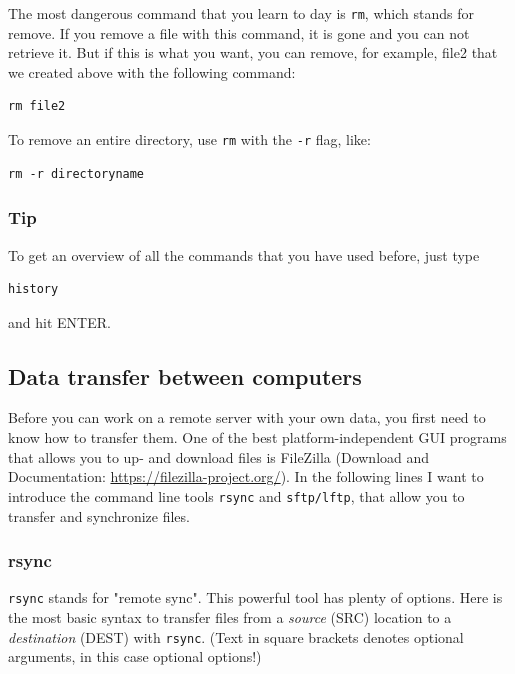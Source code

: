\documentclass[11pt]{article}
\begin{document}
The most dangerous command that you learn to day is \texttt{rm}, which stands
for remove. If you remove a file with this command, it is gone and you
can not retrieve it. But if this is what you want, you can remove, for
example, file2 that we created above with the following command:


\begin{verbatim}
rm file2
\end{verbatim}

To remove an entire directory, use \texttt{rm} with the \texttt{-r} flag, like:

\begin{verbatim}
rm -r directoryname
\end{verbatim}

\subsubsection{Tip}
\label{sec-2-1-8}
To get an overview of all the commands that you have used before, just
type


\begin{verbatim}
history
\end{verbatim}

and hit ENTER.

\subsection{Data transfer between computers}
\label{sec-2-2}
Before you can work on a remote server with your own data, you first
need to know how to transfer them.  One of the best
platform-independent GUI programs that allows you to up- and download
files is FileZilla (Download and Documentation:
\url{https://filezilla-project.org/}). In the following lines I want to
introduce the command line tools \texttt{rsync} and \texttt{sftp/lftp}, that allow
you to transfer and synchronize files.
\subsubsection{rsync}
\label{sec-2-2-1}


\texttt{rsync} stands for "remote sync". This powerful tool has plenty of
options.  Here is the most basic syntax to transfer files from a
\emph{source} (SRC) location to a \emph{destination} (DEST) with \texttt{rsync}. (Text
in square brackets denotes optional arguments, in this case optional
options!)
\end{document}
